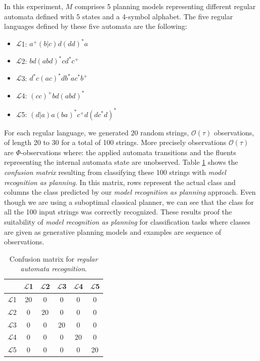 \documentclass[letterpaper]{article} %
\begin{document}
In this experiment, $M$ comprises 5 planning models representing different regular automata defined with 5 states and a 4-symbol alphabet. The five regular languages defined by these five automata are the following:
\begin{itemize}
	\item $\mathcal{L}$1: $a^+(b|c)d(dd)^*a$
	\item $\mathcal{L}$2: $bd(abd)^*cd^*c^+$
	\item $\mathcal{L}$3: $d^*c(ac)^*db^*ac^*b^+$
	\item $\mathcal{L}$4: $(cc)^+bd(abd)^*$
	\item $\mathcal{L}$5: $(d|a)a(ba)^*c^+d(dc^*d)^*$
\end{itemize}

For each regular language, we generated $20$ random strings, $\mathcal{O}(\tau)$ observations, of length 20 to 30 for a total of 100 strings. More precisely observations $\mathcal{O}(\tau)$ are $\Phi$-observations where: the applied automata transitions and the fluents representing the internal automata state are unobserved. Table \ref{tab:conf_matrix} shows the {\em confusion matrix} resulting from classifying these 100 strings with {\em model recognition as planning}. In this matrix, rows represent the actual class and columns the class predicted by our {\em model recognition as planning} approach. Even though we are using a suboptimal classical planner, we can see that the class for all the 100 input strings was correctly recognized. These results proof the suitability of {\em model recognition as planning} for classification tasks where classes are given as generative planning models and examples are sequence of observations.

\begin{table}
	\centering
	\begin{tabular}{c|c|c|c|c|c}
		& $\mathcal{L}$1 & $\mathcal{L}$2 & $\mathcal{L}$3 & $\mathcal{L}$4 & $\mathcal{L}$5\\ \hline
		$\mathcal{L}$1 & 20 & 0 & 0 & 0 & 0 \\
		$\mathcal{L}$2 & 0 & 20 & 0 & 0 & 0 \\
		$\mathcal{L}$3 & 0 & 0 & 20 & 0 & 0 \\
		$\mathcal{L}$4 & 0 & 0 & 0 & 20 & 0 \\
		$\mathcal{L}$5 & 0 & 0 & 0 & 0 & 20 \\
	\end{tabular}
	\caption{Confusion matrix for {\em regular automata recognition}.}
	\label{tab:conf_matrix}
\end{table}
\end{document}
